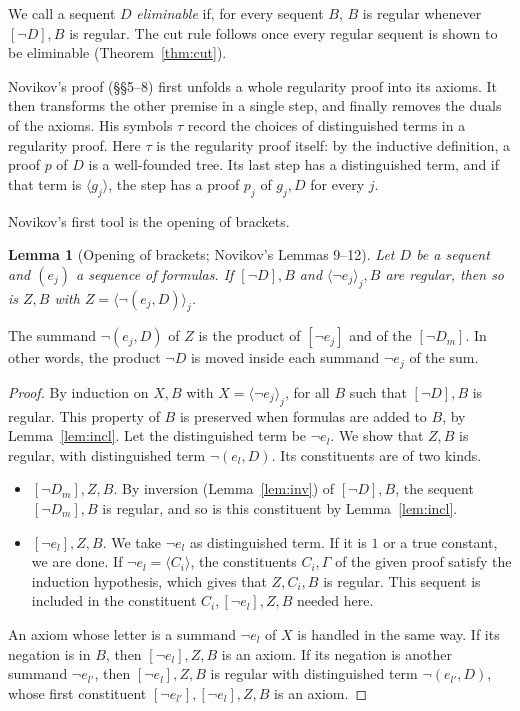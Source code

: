 \documentclass[11pt]{amsart}
\newtheorem{lemma}[theorem]{Lemma}
\theoremstyle{definition}
\theoremstyle{remark}
\newcommand{\seq}[1]{\langle #1\rangle}
\newcommand{\one}[1]{[#1]}
\begin{document}
We call a sequent $D$ \emph{eliminable} if, for every sequent $B$, $B$ is
regular whenever $\one{\neg D},B$ is regular. The cut rule follows once
every regular sequent is shown to be eliminable (Theorem~\ref{thm:cut}).

Novikov's proof (\S\S5--8) first unfolds a whole regularity proof into its
axioms. It then transforms the other premise in a single step, and finally
removes the duals of the axioms. His symbols $\tau$ record the choices of
distinguished terms in a regularity proof. Here $\tau$ is the regularity
proof itself: by the inductive definition, a proof $p$ of $D$ is a
well-founded tree. Its last step has a distinguished term, and if that
term is $\seq{g_j}$, the step has a proof $p_j$ of $g_j,D$ for every $j$.

Novikov's first tool is the opening of brackets.

\begin{lemma}[Opening of brackets; Novikov's Lemmas 9--12]\label{lem:and}
  Let $D$ be a sequent and $(e_j)$ a sequence of formulas. If
  $\one{\neg D},B$ and $\seq{\neg e_j}_j,B$ are regular, then so is
  $Z,B$ with $Z=\seq{\neg(e_j,D)}_j$.
\end{lemma}

The summand $\neg(e_j,D)$ of $Z$ is the product of $\one{\neg e_j}$ and of
the $\one{\neg D_m}$. In other words, the product $\neg D$ is moved inside
each summand $\neg e_j$ of the sum.

\begin{proof}
  By induction on $X,B$ with $X=\seq{\neg e_j}_j$, for all $B$ such that
  $\one{\neg D},B$ is regular. This property of $B$ is preserved when
  formulas are added to $B$, by Lemma~\ref{lem:incl}. Let the
  distinguished term be $\neg e_l$. We show that $Z,B$ is regular, with
  distinguished term $\neg(e_l,D)$. Its constituents are of two kinds.
  \begin{itemize}
  \item $\one{\neg D_m},Z,B$. By inversion (Lemma~\ref{lem:inv}) of
    $\one{\neg D},B$, the sequent $\one{\neg D_m},B$ is regular, and so is
    this constituent by Lemma~\ref{lem:incl}.
  \item $\one{\neg e_l},Z,B$. We take $\neg e_l$ as distinguished term. If
    it is $1$ or a true constant, we are done. If $\neg e_l=\seq{C_i}$,
    the constituents $C_i,\Gamma$ of the given proof satisfy the induction
    hypothesis, which gives that $Z,C_i,B$ is regular. This sequent is
    included in the constituent $C_i,\one{\neg e_l},Z,B$ needed here.\qedhere
  \end{itemize}
  An axiom whose letter is a summand $\neg e_l$ of $X$ is handled in the
  same way. If its negation is in $B$, then $\one{\neg e_l},Z,B$ is an axiom.
  If its negation is another summand $\neg e_{l'}$, then
  $\one{\neg e_l},Z,B$ is regular with distinguished term $\neg(e_{l'},D)$,
  whose first constituent $\one{\neg e_{l'}},\one{\neg e_l},Z,B$ is an
  axiom.
\end{proof}
\end{document}
